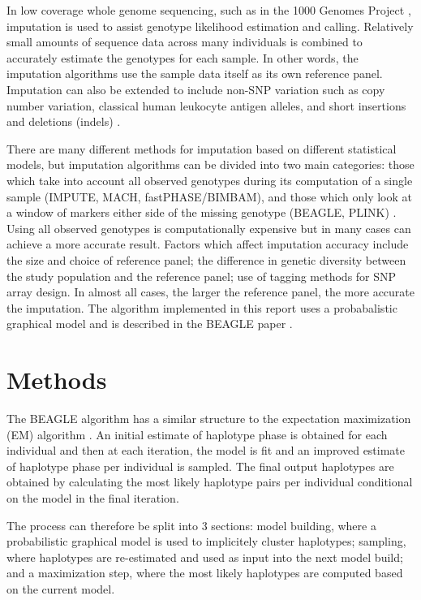 \documentclass[a4paper,12pt,twoside,abstraction,titlepage]{article}
\begin{document}
In low coverage whole genome sequencing, such as in the 1000 Genomes Project \cite{1000genomes}, imputation is used to assist genotype likelihood estimation and calling.  Relatively small amounts of sequence data across many individuals is combined to accurately estimate the genotypes for each sample.  In other words, the imputation algorithms use the sample data itself as its own reference panel.  Imputation can also be extended to include non-SNP variation such as copy number variation, classical human leukocyte antigen alleles, and short insertions and deletions (indels) \cite{review2010}.

There are many different methods for imputation based on different statistical models, but imputation algorithms can be divided into two main categories: those which take into account all observed genotypes during its computation of a single sample (IMPUTE, MACH, fastPHASE/BIMBAM), and those which only look at a window of markers either side of the missing genotype (BEAGLE, PLINK) \cite{review2009}.  Using all observed genotypes is computationally expensive but in many cases can achieve a more accurate result.  Factors which affect imputation accuracy include the size and choice of reference panel; the difference in genetic diversity between the study population and the reference panel; use of tagging methods for SNP array design.  In almost all cases, the larger the reference panel, the more accurate the imputation.  The algorithm implemented in this report uses a probabalistic graphical model and is described in the BEAGLE paper \cite{beagle3}.


\newpage
\section{Methods}
The BEAGLE algorithm has a similar structure to the expectation maximization (EM) algorithm \cite{EMalgorithm}.  An initial estimate of haplotype phase is obtained for each individual and then at each iteration, the model is fit and an improved estimate of haplotype phase per individual is sampled.  The final output haplotypes are obtained by calculating the most likely haplotype pairs per individual conditional on the model in the final iteration.

The process can therefore be split into 3 sections: model building, where a probabilistic graphical model is used to implicitely cluster haplotypes; sampling, where haplotypes are re-estimated and used as input into the next model build; and a maximization step, where the most likely haplotypes are computed based on the current model.
\end{document}

